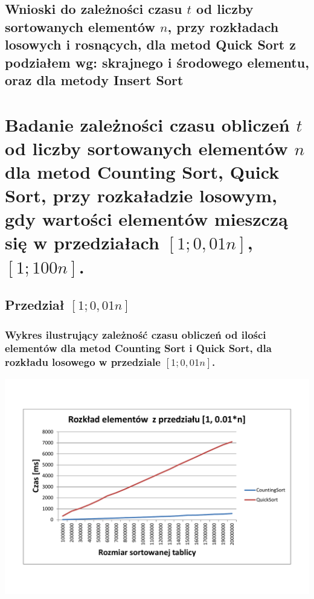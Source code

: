\documentclass[polish,polish,a4paper]{article}
\begin{document}
\begin{spacing}{1.5}
\subsection{Wnioski do zależności czasu $t$ od liczby sortowanych elementów $n$, przy rozkładach losowych i rosnących, dla metod Quick Sort z podziałem wg: skrajnego i środowego elementu, oraz dla metody Insert Sort}

\section{Badanie zależności czasu obliczeń $t$ od liczby sortowanych elementów $n$ dla metod Counting Sort, Quick Sort, przy rozkaładzie losowym, gdy wartości elementów mieszczą się w przedziałach  $ [1;0,01n] $,$ [1;100n] $. }

\subsection{Przedział $[1;0,01n]$}

\subsubsection*{Wykres ilustrujący zależność czasu obliczeń od ilości elementów dla metod Counting Sort i  Quick Sort, dla rozkładu losowego w przedziale $[1;0,01n]$.}
	
	\begin{minipage}[H]{\textwidth}
		\begin{center}
			\includegraphics[scale=0.6]{zad4001n.pdf}
			\label{fig:zad4001n}
		\end{center}
	\end{minipage}


\end{spacing}
\end{document}
